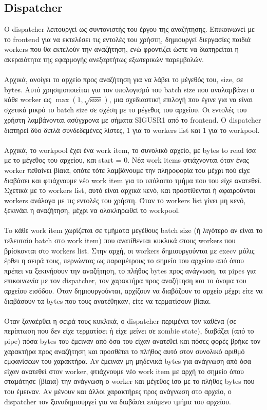 \documentclass{article}
\begin{document}
	\subsection{Dispatcher}
	
	Ο dispatcher λειτουργεί ως συντονιστής του έργου της αναζήτησης. Επικοινωνεί με το frontend για να εκτελέσει τις εντολές του χρήστη, δημιουργεί διεργασίες παιδιά workers που θα εκτελούν την αναζήτηση, ενώ φροντίζει ώστε να διατηρείται η ακεραιότητα της εφαρμογής ανεξαρτήτως εξωτερικών παρεμβολών.\\
	\\
	Αρχικά, ανοίγει το αρχείο προς αναζήτηση για να λάβει το μέγεθός του, size, σε bytes. Αυτό χρησιμοποιείται για τον υπολογισμό του batch size που αναλαμβάνει ο κάθε worker ως $\max(1, \sqrt{\text{size}})$, μια σχεδιαστική επιλογή που έγινε για να είναι σχετικά μικρό το batch size σε σχέση με το μέγεθος του αρχείου. Οι εντολές του χρήστη λαμβάνονται ασύγχρονα με σήματα SIGUSR1 από το frontend. Ο dispatcher διατηρεί δύο διπλά συνδεδεμένες λίστες, 1 για το workers list και 1 για το workpool.\\
	\\
	Αρχικά, το workpool έχει ένα work item, το συνολικό αρχείο, με bytes to read ίσα με το μέγεθος του αρχείου, και start = 0. Νέα work items φτιάχνονται όταν ένας worker πεθαίνει βίαια, οπότε τότε λαμβάνουμε την πληροφορία του μέχρι πού είχε διαβάσει και φτιάχνουμε νέο work item για το υπόλοιπο τμήμα που του είχε ανατεθεί. Σχετικά με το workers list, αυτό είναι αρχικά κενό, και προστίθενται ή αφαιρούνται workers ανάλογα με τις εντολές του χρήστη. Όταν το workers list γίνει μη κενό, ξεκινάει η αναζήτηση, μέχρι να ολοκληρωθεί το workpool.\\
	\\
	To κάθε work item χωρίζεται σε τμήματα μεγέθους batch size (ή λιγότερο αν είναι το τελευταίο batch στο work item) που ανατίθενται κυκλικά στους workers που βρίσκονται στο workers list. Στην αρχή, οι workers δημιουργούνται με execv μόλις έρθει η σειρά τους, περνώντας ως παραμέτρους το σημείο του αρχείου από όπου πρέπει να ξεκινήσουν την αναζήτηση, το πλήθος bytes προς ανάγνωση, τα pipes για επικοινωνία με τον dispatcher, τον χαρακτήρα προς αναζήτηση και το όνομα του αρχείου εισόδου. Όταν δημιουργούνται, αρχίζουν να διαβάζουν το αρχείο μέχρι είτε να διαβάσουν τα bytes που τους ανατέθηκαν, είτε να τερματίσουν βίαια.\\
	\\
	Όταν ξαναέρθει η σειρά τους κυκλικά, ο dispatcher περιμένει τον καθένα (σε περίπτωση που δεν είχε τερματίσει ή είχε μείνει σε zombie state), διαβάζει (από το pipe) πόσα bytes του έμειναν από όσα του είχαν ανατεθεί και πόσες φορές βρήκε τον χαρακτήρα προς αναζήτηση και προσθέτει το πλήθος αυτό στον συνολικό αριθμό εμφανίσεων του χαρακτήρα. Αν έμειναν μη μηδενικά bytes για ανάγνωση από όσα είχαν ανατεθεί στον worker, φτιάχνουμε νέο work item με αρχή το σημείο όπου σταμάτησε (βίαια) την ανάγνωση ο worker και μέγεθος ίσο με το πλήθος bytes που του έμειναν. Αν μένουν και άλλοι χαρακτήρες προς ανάγνωση στο αρχείο, ο dispatcher τον ξαναδημιουργεί για να διαβάσει επόμενο τμήμα του αρχείου.\\
\end{document}
